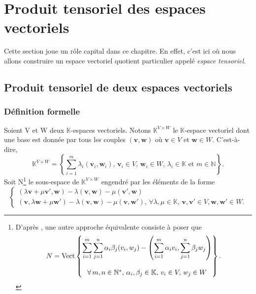 \documentclass[11pt,a4paper,oneside]{book}
\newtheorem{defi}{Définition}[chapter]
\def\N{\mathbb N}
\def\K{\mathbb K}
\def\v{\mathbf v}
\def\w{\mathbf w}
\def\spam{\rm Vect}
\begin{document}
\section{Produit tensoriel des espaces vectoriels}
\label{sec:1.2tensor}
Cette section joue un rôle capital dans ce chapitre. En effet, c'est ici où nous allons construire un espace vectoriel quotient particulier appelé \textit{espace tensoriel}.
\subsection{Produit tensoriel de deux espaces vectoriels}
\subsubsection{Définition formelle}\label{section 3.2.1}
Soient V et W deux $ \K $-espaces vectoriels. Notons $ \K^{V\times W} $ le $ \K $-espace vectoriel dont une base est donnée par tous les couples $ (\v,\w) $ où $ \v\in V $ et $ \w\in W $. C'est-à-dire,
\begin{equation}
\K^{V\times W}=\left\{\sum_{i=1}^{m}\lambda_{i}(\v_{i},\w_{i}), \, \v_{i}\in V,\,\w_{i}\in W,\,\lambda_{i}\in \K \text{ et }m\in \N\right\}.
\end{equation}
 Soit N\footnote{D'après \cite[p.51]{hackbusch2012tensor}, une autre approche équivalente consiste à poser que\begin{equation*}
 	N=\spam\begin{Bmatrix}
 	\displaystyle\sum_{i=1}^{m}\displaystyle\sum_{j=1}^{n}\alpha_{i}\beta_{j}(v_{i},w_{j})-\left(\displaystyle\sum_{i=1}^{m}\alpha_{i}v_{i},\displaystyle\sum_{j=1}^{n}\beta_{j}w_{j}\right)\\
 	\\
 	\forall\, m,n\in \N^{*},\,\alpha_{i},\beta_{j}\in \K,\, v_{i}\in V,\,w_{j}\in W
 	\end{Bmatrix}.
 	\end{equation*}} le sous-espace de $ \K^{V\times W} $ engendré  par les
éléments de la forme
\begin{equation}
\begin{cases}
 (\lambda \v+\mu\v',\w)-\lambda(\v,\w)-\mu(\v',\w)\\
(\v,\lambda \w+\mu\w')-\lambda(\v,\w)-\mu(\v,\w'),\, \forall\lambda,\mu\in\K,\,\v,\v'\in V, \w,\w'\in W.
\end{cases}
\end{equation}
\end{document}
